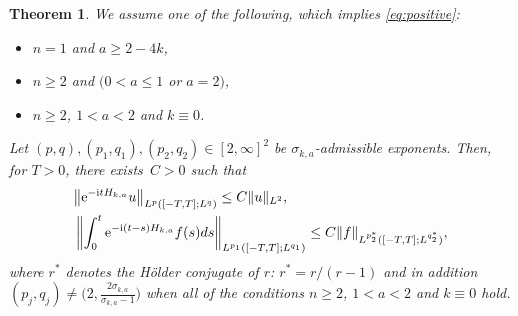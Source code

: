\documentclass[10pt,a4paper]{amsart}
\numberwithin{equation}{section}
\newtheorem{Theorem}{Theorem}[section]
\def\s{\sigma}
\begin{document}
\begin{Theorem}\label{mainthmSt}
We assume one of the following, which implies \eqref{eq:positive}:
\begin{itemize}\itemsep=0pt
\item $n=1$ and $a\ge 2-4k$,
\item $n\ge 2$ and $(0<a\le 1$ or $a=2)$,
\item $n\ge 2$, $1<a<2$ and $k\equiv 0$.
\end{itemize}
Let $(p,q), (p_1,q_1), (p_2,q_2)\in [2,\infty]^2$ be $\sigma_{k,a}$-admissible exponents.
Then, for $T>0$, there exists~${C>0}$ such that
\begin{align}
&\big\|{\rm e}^{-{\rm i}tH_{k,a}}u\big\|_{L^p([-T,T]; L^q)}\leq C\|u\|_{L^2}\label{homStr},\\
&\left\|\int_{0}^t{\rm e}^{-{\rm i}(t-s)H_{k,a}}f(s)ds \right\|_{L^{p_1}([-T,T]; L^{q_1})} \leq C\|f\|_{L^{p_2^*}([-T,T]; L^{q_2^*})},\label{inhomStr}
\end{align}
where $r^*$ denotes the H\"older conjugate of $r$: $r^*=r/(r-1)$ and in addition $(p_j,q_j)\neq \bigl(2,\frac{2\s_{k,a}}{\s_{k,a}-1}\bigr)$ when all of the conditions $n\geq 2$, $1<a<2$ and $k\equiv 0$ hold.
\end{Theorem}
\end{document}
